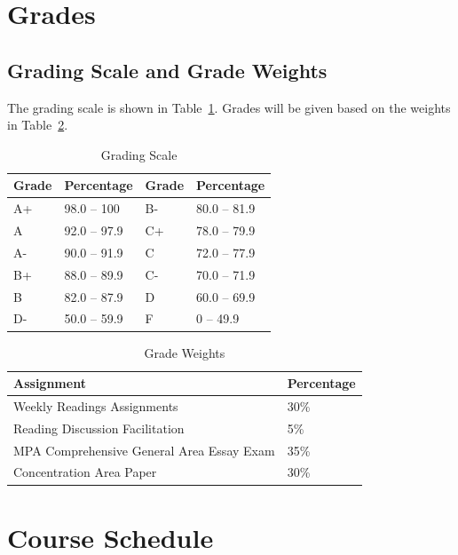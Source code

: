 \documentclass[12pt, letterpaper]{article}
\begin{document}
\section{Grades}


\subsection*{Grading Scale and Grade Weights}  

The grading scale is shown in Table~\ref{tab:grading-scale}. Grades will be given based on the weights in Table~\ref{tab:grade-weights}.

\begin{table}[h]
\centering
\caption{Grading Scale}
\begin{tabular}{llll}
\toprule
\textbf{Grade} & \textbf{Percentage} & \textbf{Grade} & \textbf{Percentage} \\
\midrule
A+ & 98.0 -- 100 & B- & 80.0 -- 81.9\\
A & 92.0 -- 97.9 & C+ & 78.0 -- 79.9\\
A- & 90.0 -- 91.9 & C & 72.0 -- 77.9\\
B+ & 88.0 -- 89.9 & C- & 70.0 -- 71.9\\
B & 82.0 -- 87.9 & D & 60.0 -- 69.9\\
D- & 50.0 -- 59.9 & F & 0 -- 49.9\\

\bottomrule
\end{tabular}
\label{tab:grading-scale}
\end{table}

\begin{table}[h!]
    \centering
    \caption{Grade Weights}
    \begin{tabular}{ll}
        \toprule
    \textbf{Assignment} & \textbf{Percentage} \\
    \midrule
    Weekly Readings Assignments & 30\% \\
    Reading Discussion Facilitation & 5\% \\
    MPA Comprehensive General Area Essay Exam & 35\% \\
    Concentration Area Paper & 30\% \\
    \bottomrule
    \end{tabular}
    \label{tab:grade-weights}
    \end{table}
    
\section{Course Schedule}
\end{document}
